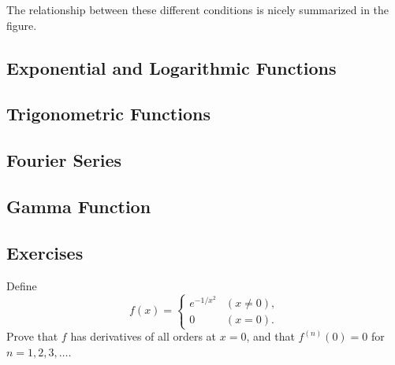   The relationship between these different conditions is nicely summarized in the figure. 
  \begin{center}
  \end{center}

\subsection{Exponential and Logarithmic Functions} 

\subsection{Trigonometric Functions} 

\subsection{Fourier Series}

	\begin{theorem}
		
	\end{theorem}

\subsection{Gamma Function}

	\begin{theorem}
	  
	\end{theorem}

\subsection{Exercises} 

  \begin{exercise}[Rudin 8.1]
    Define
    \begin{equation}
      f(x) = \begin{cases} e^{-1/x^2} & (x \neq 0), \\ 0 & (x = 0). \end{cases}
    \end{equation}
    Prove that $f$ has derivatives of all orders at $x = 0$, and that $f^{(n)}(0) = 0$ for $n = 1, 2, 3, \dots$.
  \end{exercise}
  \begin{solution}

  \end{solution}

